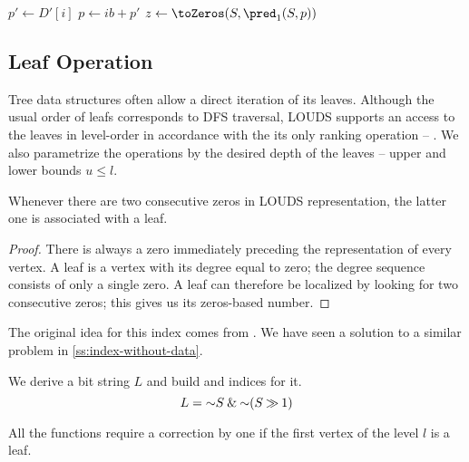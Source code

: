 \begin{algorithm}
\begin{algorithmic}
 
	\State $p' \gets D'[i]$
	 
		\State {}
	\Else
		\State $p \gets i b + p'$
		 
			\State {} 
		\Else
			\State $z \gets \toZeros(S, \pred_1(S, p))$
			 
				\State {}
			\Else
				\State \Return{$\blockOfD[S[i b : (i + 1) b], p', z \% b]$}
			\EndIf
		\EndIf
	\EndIf
\EndFunction
\end{algorithmic}
\end{algorithm}

\subsection{\label{ss:leaf-queries}Leaf Operation}

Tree data structures often allow a direct iteration of its leaves.
Although the usual order of leafs corresponds to DFS traversal, LOUDS supports an access to the leaves in level-order in accordance with the its only ranking operation -- \inRank{}.
We also parametrize the operations by the desired depth of the leaves -- upper and lower bounds $u \le l$.

\begin{lemma}
	Whenever there are two consecutive zeros in LOUDS representation, the latter one is associated with a leaf.
\end{lemma}
\begin{proof}
	There is always a zero immediately preceding the representation of every vertex.
	A leaf is a vertex with its degree equal to zero; the degree sequence consists of only a single zero.
	A leaf can therefore be localized by looking for two consecutive zeros; this gives us its zeros-based number.
\end{proof}

The original idea for this index comes from \cite{munro1998space}.
We have seen a solution to a similar problem in \ref{ss:index-without-data}.

We derive a bit string $L$ and build \rank{} and \select{} indices for it.
$$L = \mathord{\sim} S \mathbin{\&} \mathord{\sim} (S \mathbin{\gg} 1)$$

All the functions require a correction by one if the first vertex of the level $l$ is a leaf.

